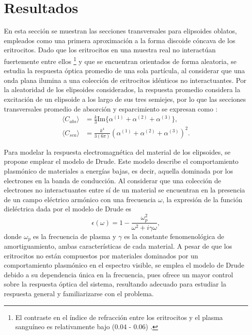 	\hypertarget{resultados}{\section{Resultados}}
En esta sección se muestran las secciones transversales para elipsoides oblatos, empleados como una primera aproximación a la forma discoide cóncava de los eritrocitos. Dado que los eritrocitos en una muestra real no interactúan fuertemente entre ellos \footnote{El contraste en el índice de refracción entre los eritrocitos y el plasma sanguíneo es relativamente bajo (0.04 - 0.06) \cite{Blood}.} y que se encuentran orientados de forma aleatoria, se estudia la respuesta óptica promedio de una sola partícula, al considerar que una onda plana  ilumina a una colección de eritrocitos idénticos no interactuantes.  Por la aleatoridad de los elipsoides considerados, la respuesta promedio considera la excitación de un elipsoide a los largo de sus tres semiejes, por lo que las secciones transversales promedio de absorción y esparcimiento se expresan como \cite{Bohren}:
\begin{align*}
	\langle C_{abs}\rangle &= \frac{k}{3} \text{Im}\{\alpha^{(1)}+\alpha^{(2)}+\alpha^{(3)}\},\\
	\langle C_{sca}\rangle &= \frac{k^4}{3(6\pi)} \left(\alpha^{(1)}+\alpha^{(2)}+\alpha^{(3)}\right)^2.
\end{align*}

Para modelar la respuesta electromagnética del material de los elipsoides, se propone emplear el modelo de Drude. Este modelo describe el comportamiento plasmónico de materiales a energías bajas, es decir, aquella dominada por los electrones en la banda de conducción. Al considerar que una colección de electrones no interactuantes entre sí de un material se encuentran en la presencia de un campo eléctrico armónico con una frecuencia $\omega$, la expresión de la función dieléctrica dada por el modelo de Drude es \cite{Plasmonics}
\begin{equation} \epsilon(\omega) = 1 - \frac{\omega_p^2}{\omega^2 + i\gamma\omega}, 
\label{Drude}
\end{equation}
donde $\omega_p$ es la frecuencia de plasma y $\gamma$ es la constante fenomenológica de amortiguamiento, ambas características de cada material. A pesar de  que los eritrocitos no están compuestos por materiales dominados por un comportamiento plasmónico en el espectro visible, se emplea el modelo de Drude debido a su dependencia única en la frecuencia, pues ofrece un mayor control sobre la respuesta óptica del sistema, resultando adecuado para estudiar la respuesta general y familiarizarse con el problema.\\

